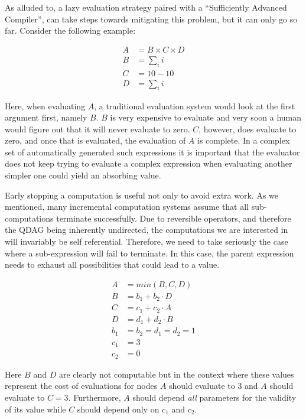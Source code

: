 As alluded to, a lazy evaluation strategy paired with a ``Sufficiently
Advanced Compiler'', can take steps towards mitigating this problem,
but it can only go so far. Consider the following example:

\begin{align*}
A &= B \times C \times D \\
B &= \sum_i{i} \\
C &= 10 - 10 \\
D &= \sum_i{i}
\end{align*}

Here, when evaluating \(A\), a traditional evaluation system would
look at the first argument first, namely \(B\). \(B\) is very
expensive to evaluate and very soon a human would figure out that it
will never evaluate to zero. \(C\), however, does evaluate to zero,
and once that is evaluated, the evaluation of \(A\) is complete. In a
complex set of automatically generated such expressions it is
important that the evaluator does not keep trying to evaluate a
complex expression when evaluating another simpler one could yield an
absorbing value.

Early stopping a computation is useful not only to avoid extra
work. As we mentioned, many incremental computation systems assume
that all sub-computations terminate successfully. Due to reversible
operators, and therefore the QDAG being inherently undirected, the
computations we are interested in will invariably be self
referential. Therefore, we need to take seriously the case where a
sub-expression will fail to terminate. In this case, the parent
expression needs to exhaust all possibilities that could lead to a
value.

\begin{align*}
A &= min(B, C, D) \\
B &= b_1 + b_2 \cdot D \\
C &= c_1 + c_2 \cdot A \\
D &= d_1 + d_2 \cdot B \\
b_1 &= b_2 = d_1 = d_2 = 1 \\
c_1 &= 3 \\
c_2 &= 0
\end{align*}

Here \(B\) and \(D\) are clearly not computable but in the context
where these values represent the cost of evaluations for nodes \(A\)
should evaluate to 3 and \(A\) should evaluate to \(C =
3\). Furthermore, \(A\) should depend \emph{all} parameters for the
validity of its value while \(C\) should depend only on \(c_1\) and
\(c_2\).


